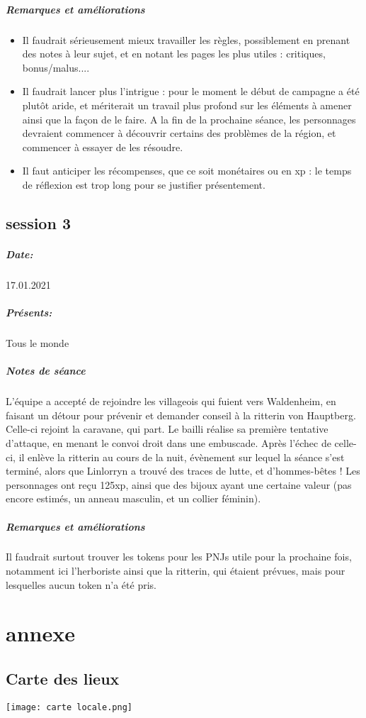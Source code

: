 \documentclass[10pt,a4paper]{book}
\begin{document}
\paragraph{Remarques et améliorations}
\begin{itemize}
\item Il faudrait sérieusement mieux travailler les règles, possiblement en prenant des notes à leur sujet, et en notant les pages les plus utiles : critiques, bonus/malus....
\item Il faudrait lancer plus l'intrigue : pour le moment le début de campagne a été plutôt aride, et mériterait un travail plus profond sur les éléments à amener ainsi que la façon de le faire. A la fin de la prochaine séance, les personnages devraient commencer à découvrir certains des problèmes de la région, et commencer à essayer de les résoudre.
\item Il faut anticiper les récompenses, que ce soit monétaires ou en xp : le temps de réflexion est trop long pour se justifier présentement.
\end{itemize}
\section{session 3}
\paragraph{Date:} 17.01.2021
\paragraph{Présents:}Tous le monde
\paragraph{Notes de séance} L'équipe a accepté de rejoindre les villageois qui fuient vers Waldenheim, en faisant un détour pour prévenir et demander conseil à la ritterin von Hauptberg. Celle-ci rejoint la caravane, qui part. Le bailli réalise sa première tentative d'attaque, en menant le convoi droit dans une embuscade. Après l'échec de celle-ci, il enlève la ritterin au cours de la nuit, évènement sur lequel la séance s'est terminé, alors que Linlorryn a trouvé des traces de lutte, et d'hommes-bêtes ! Les personnages ont reçu 125xp, ainsi que des bijoux ayant une certaine valeur (pas encore estimés, un anneau masculin, et un collier féminin).
\paragraph{Remarques et améliorations}
Il faudrait surtout trouver les tokens pour les PNJs utile pour la prochaine fois, notamment ici l'herboriste ainsi que la ritterin, qui étaient prévues, mais pour lesquelles aucun token n'a été pris.
\chapter*{annexe}
\section{Carte des lieux}
\texttt{[image: carte locale.png]}
\end{document}
